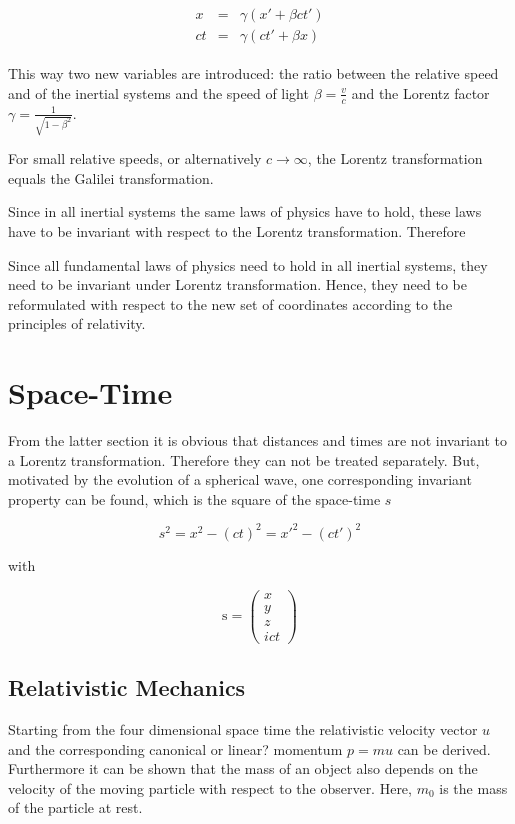 \begin{eqnarray}\begin{array}{rcl}\label{lorentz2}
 x   &=& \gamma\left(x'+\beta ct'\right)\\
 ct  &=& \gamma\left(ct'+\beta x\right)
\end{array}\end{eqnarray}

This way two new variables are introduced: the ratio between the relative speed
and of the inertial systems and the speed of light $\beta = \frac vc$ and the
Lorentz factor $\gamma = \frac 1{\sqrt{1-\beta^2}}$.

For small relative speeds, or alternatively $c\rightarrow\infty$, the Lorentz
transformation equals the Galilei transformation.

Since in all inertial systems the same laws of physics have to hold, these laws
have to be invariant with respect to the Lorentz transformation. Therefore

Since all fundamental laws of physics need to hold in all inertial systems,
they need to be invariant under Lorentz transformation. Hence, they need to be
reformulated with respect to the new set of coordinates according to
the principles of relativity. \cite{einstein88}


\section{Space-Time}
From the latter section it is obvious that distances and times are not
invariant to a Lorentz transformation. Therefore they can not be treated
separately. But, motivated by the evolution of a spherical wave, one corresponding
invariant property can be found, which is the square of the space-time $s$

\begin{equation}\label{linvarianz}
 s^2 = x^2 - \left(ct\right)^2 = x'^2 - \left(ct'\right)^2
\end{equation}

with

\begin{equation}\label{vierervec}
 \mathrm{s} = \begin{pmatrix}x\\y\\z\\ict\end{pmatrix}
\end{equation}



\subsection{Relativistic Mechanics}
Starting from the four dimensional space time the relativistic velocity vector $u$
and the corresponding canonical or linear? momentum $p=mu$ can be derived.
Furthermore it can be shown that the mass of an object also depends on the
velocity of the moving particle with respect to the observer. Here, $m_0$ is the
mass of the particle at rest.

